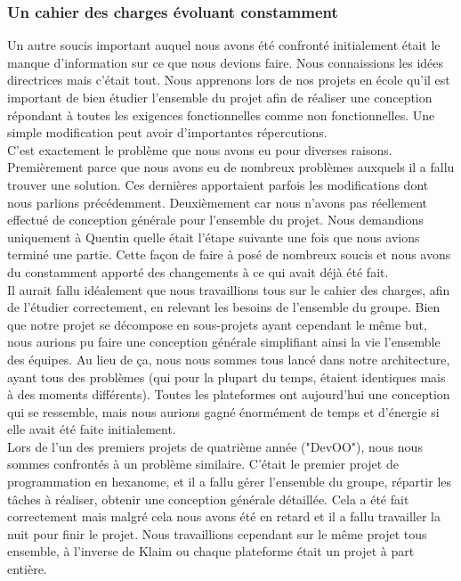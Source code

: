 \documentclass{article}
\begin{document}
\subsubsection{Un cahier des charges évoluant constamment}
		Un autre soucis important auquel nous avons été confronté initialement était le manque d'information sur ce que nous devions faire. Nous connaissions les idées directrices mais c'était tout. Nous apprenons lors de nos projets en école qu'il est important de bien étudier l'ensemble du projet afin de réaliser une conception répondant à toutes les exigences fonctionnelles comme non fonctionnelles. Une simple modification peut avoir d'importantes répercutions. \\
			
		C'est exactement le problème que nous avons eu pour diverses raisons. Premièrement parce que nous avons eu de nombreux problèmes auxquels il a fallu trouver une solution. Ces dernières apportaient parfois les modifications dont nous parlions précédemment. Deuxièmement car nous n'avons pas réellement effectué de conception générale pour l'ensemble du projet. Nous demandions uniquement à Quentin quelle était l'étape suivante une fois que nous avions terminé une partie. Cette façon de faire à posé de nombreux soucis et nous avons du constamment apporté des changements à ce qui avait déjà été fait.\\
		
		Il aurait fallu idéalement que nous travaillions tous sur le cahier des charges, afin de l'étudier correctement, en relevant les besoins de l'ensemble du groupe. Bien que notre projet se décompose en sous-projets ayant cependant le même but, nous aurions pu faire une conception générale simplifiant ainsi la vie l'ensemble des équipes. Au lieu de ça, nous nous sommes tous lancé dans notre architecture, ayant tous des problèmes (qui pour la plupart du temps, étaient identiques mais à des moments différents). Toutes les plateformes ont aujourd'hui une conception qui se ressemble, mais nous aurions gagné énormément de temps et d'énergie si elle avait été faite initialement. \\
		
		Lors de l'un des premiers projets de quatrième année ("DevOO"), nous nous sommes confrontés à un problème similaire. C'était le premier projet de programmation en hexanome, et il a fallu gérer l'ensemble du groupe, répartir les tâches à réaliser, obtenir une conception générale détaillée. Cela a été fait correctement mais malgré cela nous avons été en retard et il a fallu travailler la nuit pour finir le projet. Nous travaillions cependant sur le même projet tous ensemble, à l'inverse de Klaim ou chaque plateforme était un projet à part entière. \\
		
\end{document}
